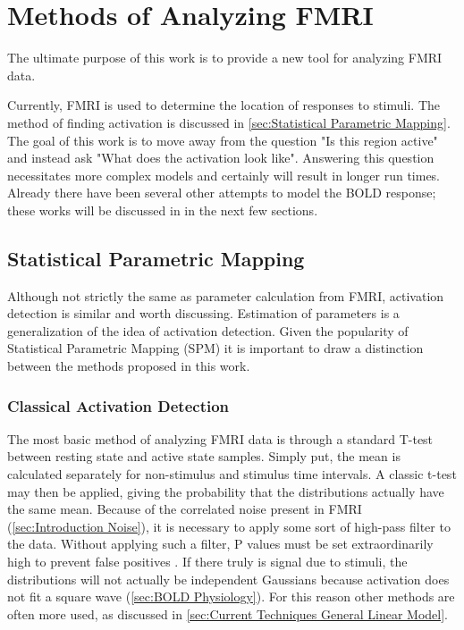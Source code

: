 \chapter{Methods of Analyzing FMRI}
\label{sec:Prior Works}
The ultimate purpose of this work is to provide a new tool
for analyzing FMRI data. 

Currently, FMRI is used to determine the location of responses
to stimuli. The method of finding activation is discussed in 
\autoref{sec:Statistical Parametric Mapping}. The goal of this 
work is to move away from the question "Is this region active"
and instead ask "What does the activation look like". Answering
this question necessitates more complex models and certainly
will result in longer run times. Already there have been several other
attempts to model the BOLD response; these works will be discussed
in in the next few sections.

\section{Statistical Parametric Mapping}
\label{sec:Statistical Parametric Mapping}
Although not strictly the same as parameter calculation from 
FMRI, activation detection is similar and worth discussing. Estimation of 
parameters is a generalization of the idea of activation detection.
Given the popularity of Statistical Parametric Mapping (SPM) 
it is important to draw a distinction between the methods proposed
in this work.

\subsection{Classical Activation Detection}
\label{sec:Square Wave}
The most basic method of analyzing FMRI data is through a standard T-test
between resting state and active state samples. Simply put, the
mean is calculated separately for non-stimulus and stimulus time intervals.
A classic t-test may then be applied, giving the probability that the
distributions actually have the same mean. Because of the correlated
noise present in FMRI (\autoref{sec:Introduction Noise}), it is necessary
to apply some sort of high-pass filter to the data. Without applying
such a filter, P values must be set extraordinarily high to prevent
false positives \cite{Smith2007}. If there truly is signal
due to stimuli, the distributions will not actually be independent
Gaussians because activation does not fit a square wave 
(\autoref{sec:BOLD Physiology}). For this reason other methods
are often more used, as discussed in 
\autoref{sec:Current Techniques General Linear Model}.

